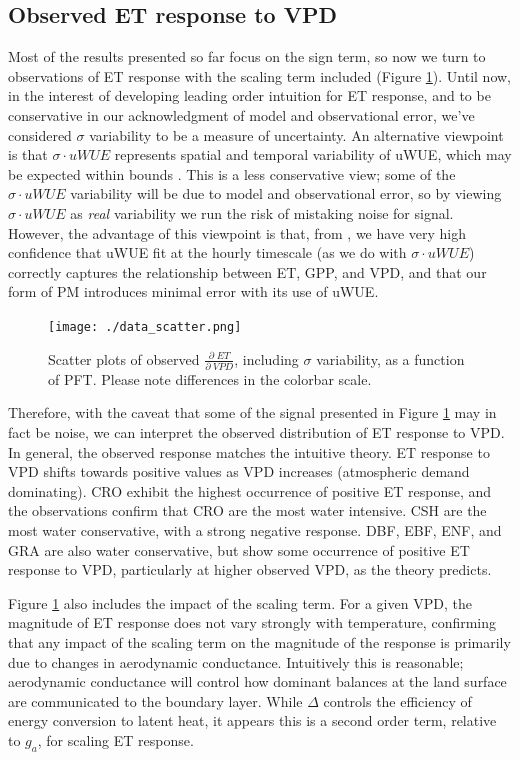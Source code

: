 \documentclass[draft,linenumbers]{gcbjournal}
\begin{document}
\subsection{Observed ET response to VPD}

Most of the results presented so far focus on the sign term, so now we turn to observations of ET response with the scaling term included (Figure \ref{data_scatter}). Until now, in the interest of developing leading order intuition for ET response, and to be conservative in our acknowledgment of model and observational error, we've considered $\sigma$ variability to be a measure of uncertainty. An alternative viewpoint is that $\sigma \cdot uWUE$ represents spatial and temporal variability of uWUE, which may be expected within bounds \citep[see Table \ref{pft}, also ][]{Zhou_2015}. This is a less conservative view; some of the $\sigma \cdot uWUE$ variability will be due to model and observational error, so by viewing $\sigma \cdot uWUE$ as \textit{real} variability we run the risk of mistaking noise for signal. However, the advantage of this viewpoint is that, from \citet{Zhou_2014}, we have very high confidence that uWUE fit at the hourly timescale (as we do with $\sigma \cdot uWUE$) correctly captures the relationship between ET, GPP, and VPD, and that our form of PM introduces minimal error with its use of uWUE.

\begin{figure}
\centering
\centerline{\texttt{[image: ./data\_scatter.png]}}
\caption{Scatter plots of observed $\frac{\partial \; ET}{\partial \; VPD}$, including $\sigma$ variability, as a function of PFT. Please note differences in the colorbar scale.}
\label{data_scatter}
\end{figure}

Therefore, with the caveat that some of the signal presented in Figure \ref{data_scatter} may in fact be noise, we can interpret the observed distribution of ET response to VPD. In general, the observed response matches the intuitive theory. ET response to VPD shifts towards positive values as VPD increases (atmospheric demand dominating). CRO exhibit the highest occurrence of positive ET response, and the observations confirm that CRO are the most water intensive. CSH are the most water conservative, with a strong negative response. DBF, EBF, ENF, and GRA are also water conservative, but show some occurrence of positive ET response to VPD, particularly at higher observed VPD, as the theory predicts.

Figure \ref{data_scatter} also includes the impact of the scaling term. For a given VPD, the magnitude of ET response does not vary strongly with temperature, confirming that any impact of the scaling term on the magnitude of the response is primarily due to changes in aerodynamic conductance. Intuitively this is reasonable; aerodynamic conductance will control how dominant balances at the land surface are communicated to the boundary layer. While $\Delta$ controls the efficiency of energy conversion to latent heat, it appears this is a second order term, relative to $g_a$, for scaling ET response. 
\end{document}
